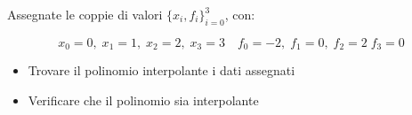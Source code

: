 Assegnate le coppie di valori $\{x_i,f_i \}_{i=0}^3$, con:

\[ x_0=0, \; x_1=1, \; x_2=2, \; x_3=3 \quad f_0=-2, \; f_1=0, \; f_2=2 \; f_3=0 \]

\begin{itemize}
\item Trovare il polinomio interpolante i dati assegnati
\item Verificare che il polinomio sia interpolante
\end{itemize}
